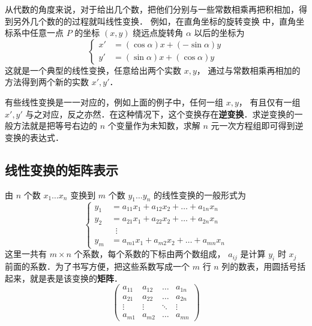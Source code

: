 

从代数的角度来说，对于给出几个数，把他们分别与一些常数相乘再把积相加，得到另外几个数的的过程就叫线性变换． 例如，在直角坐标的旋转变换%
中，直角坐标系中任意一点 $P$ 的坐标 $( {x,y} )$ 绕远点旋转角 $\alpha $ 以后的坐标为
\begin{equation}\label{LTrans_eq1}
\left\{\begin{aligned}
x' &= \left( {\cos \alpha } \right)x + \left( { - \sin \alpha } \right)y\\
y' &= \left( {\sin \alpha } \right)x + \left( {\cos \alpha } \right)y
\end{aligned}\right.\end{equation}
这就是一个典型的线性变换，任意给出两个实数 $x,y$， 通过与常数相乘再相加的方法得到两个新的实数  $x',y'$． 

有些线性变换是一一对应的，例如上面的例子中，任何一组 $x,y$， 有且仅有一组 $x',y'$ 与之对应，反之亦然．在这种情况下，这个变换存在\textbf{逆变换}．求逆变换的一般方法就是把等号右边的 $n$ 个变量作为未知数，求解 $n$ 元一次方程组即可得到逆变换的表达式．


\subsection{线性变换的矩阵表示}

由 $n$ 个数 ${x_1} \ldots {x_n}$ 变换到 $m$ 个数 ${y_1} \ldots {y_n}$ 的线性变换的一般形式为
\begin{equation}
\left\{ \begin{aligned}
{y_1} &= {a_{11}}{x_1} + {a_{12}}{x_2} + \ldots + {a_{1n}}{x_n}\\
{y_2} &= {a_{21}}{x_1} + {a_{22}}{x_2} + \ldots + {a_{2n}}{x_n}\\
&\;\;\vdots \\
{y_m} &= {a_{m1}}{x_1} + {a_{m2}}{x_2} + \ldots + {a_{mn}}{x_n}
\end{aligned} \right. 
\end{equation} 
这里一共有 $m \times n$ 个系数，每个系数的下标由两个数组成， ${a_{ij}}$ 是计算 ${y_i}$ 时 ${x_j}$ 前面的系数．为了书写方便，把这些系数写成一个 $m$ 行 $n$ 列的数表，用圆括号括起来，就是表是该变换的\textbf{矩阵}．
\begin{equation}
\left( {\begin{array}{*{20}{c}}
{{a_{11}}}&{{a_{12}}}& \ldots &{{a_{1n}}}\\
{{a_{21}}}&{{a_{22}}}& \ldots &{{a_{2n}}}\\
 \vdots & \vdots & \ddots & \vdots \\
{{a_{m1}}}&{{a_{m2}}}& \ldots &{{a_{mn}}}
\end{array}} \right)
\end{equation} 
